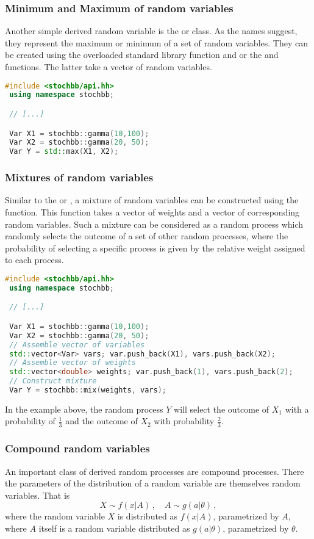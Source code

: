\subsubsection{Minimum and Maximum of random variables}
Another simple derived random variable is the  or  class. As the
names suggest, they represent the maximum or minimum of a set of random variables. They can be
created using the overloaded standard library function  and  or the
 and  functions. The latter take a vector of random variables.
\begin{lstlisting}[language=C++]
 #include <stochbb/api.hh>
 using namespace stochbb;

 // [...]

 Var X1 = stochbb::gamma(10,100);
 Var X2 = stochbb::gamma(20, 50);
 Var Y = std::max(X1, X2);
\end{lstlisting}

\subsubsection{Mixtures of random variables}
Similar to the  or , a mixture of random variables can be
constructed using the  function. This function takes a vector of weights and a vector
of corresponding random variables. Such a mixture can be considered as a random process which
randomly selects the outcome of a set of other random processes, where the probability of
selecting a specific process is given by the relative weight assigned to each process.
\begin{lstlisting}[language=C++]
 #include <stochbb/api.hh>
 using namespace stochbb;

 // [...]

 Var X1 = stochbb::gamma(10,100);
 Var X2 = stochbb::gamma(20, 50);
 // Assemble vector of variables
 std::vector<Var> vars; var.push_back(X1), vars.push_back(X2);
 // Assemble vector of weights
 std::vector<double> weights; var.push_back(1), vars.push_back(2);
 // Construct mixture
 Var Y = stochbb::mix(weights, vars);
\end{lstlisting}

In the example above, the random process $Y$ will select the outcome of $X_1$ with
a probability of $\frac{1}{3}$ and the outcome of $X_2$ with probability
$\frac{2}{3}$.

\subsubsection{Compound random variables}
An important class of derived random processes are compound processes. There the parameters of the
distribution of a random variable are themselves random variables. That is
\begin{equation}
 X \sim f(x|A)\,,\quad A \sim g(a|\theta)\,, \nonumber
\end{equation}
where the random variable $X$ is distributed as $f(x|A)$, parametrized by $A$,
where $A$ itself is a random variable distributed as $g(a|\theta)$, parametrized by
$\theta$. 

